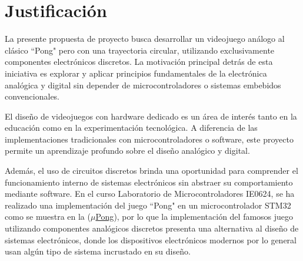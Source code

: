 \section{Justificación}

La presente propuesta de proyecto busca desarrollar un videojuego análogo al clásico ``Pong" pero con una trayectoria circular, utilizando exclusivamente componentes electrónicos discretos. 
La motivación principal detrás de esta iniciativa es explorar y aplicar principios fundamentales de la electrónica analógica y digital sin depender de microcontroladores o sistemas embebidos convencionales.

El diseño de videojuegos con hardware dedicado es un área de interés tanto en la educación como en la experimentación tecnológica. 
A diferencia de las implementaciones tradicionales con microcontroladores o software, este proyecto permite un aprendizaje profundo sobre el diseño analógico y digital. 

Además, el uso de circuitos discretos brinda una oportunidad para comprender el funcionamiento interno de sistemas electrónicos sin abstraer su comportamiento mediante software. 
En el curso Laboratorio de Microcontroladores IE0624, se ha realizado una implementación del juego ``Pong" en un microcontrolador STM32 como se muestra en la  (\href{https://github.com/Roger-505/ie0624/tree/main/proyecto}{$\mu$Pong}), por lo que la implementación del famosos juego utilizando componentes analógicos discretos presenta una alternativa al diseño de sistemas electrónicos, donde los dispositivos electrónicos modernos por lo general usan algún tipo de sistema incrustado en su diseño. 

